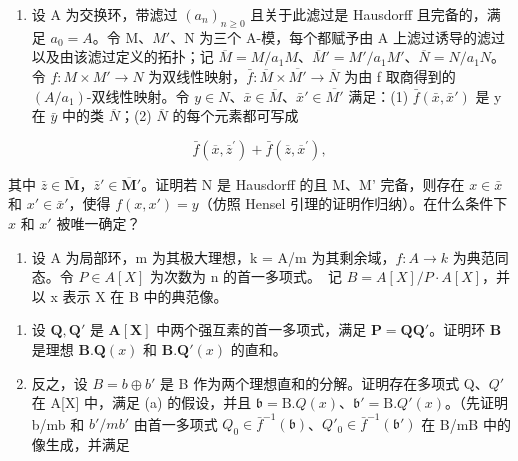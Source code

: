 
\begin{enumerate}
\def\labelenumi{\arabic{enumi}.}
\tightlist
\item
  设 A 为交换环，带滤过 \((a_{n})_{n\geq0}\) 且关于此滤过是 Hausdorff 且完备的，满足 \(a_{0}=A\)。令 M、\(M'\)、N 为三个 A-模，每个都赋予由 A 上滤过诱导的滤过以及由该滤过定义的拓扑；记 \(\overline{M}=M/a_{1}M\)、\(\overline{M}'=M'/a_{1}M'\)、\(\overline{N}=N/a_{1}N\)。令 \(f: M\times M'\to N\) 为双线性映射，\(\bar{f}: \overline{M}\times\overline{M'}\to\overline{N}\) 为由 f 取商得到的 \((A/a_{1})\)-双线性映射。令 \(y\in N\)、\(\bar{x}\in\overline{M}\)、\(\bar{x}'\in\overline{M'}\) 满足：(1) \(\bar{f}(\bar{x},\bar{x}')\) 是 y 在 \(\bar{y}\) 中的类 \(\overline{N}\)；(2) \(\overline{N}\) 的每个元素都可写成
\end{enumerate}

\[
\bar {f} (\overline {{{x}}}, \overline {{{z}}} ^ {\prime}) + \bar {f} (\overline {{{z}}}, \overline {{{x}}} ^ {\prime}),
\]

其中 \(\bar{z} \in \overline{\mathbf{M}}\)，\(\bar{z}' \in \overline{\mathbf{M}}'\)。证明若 N 是 Hausdorff 的且 M、M' 完备，则存在 \(x \in \bar{x}\) 和 \(x' \in \bar{x}'\)，使得 \(f(x, x') = y\)（仿照 Hensel 引理的证明作归纳）。在什么条件下 \(x\) 和 \(x'\) 被唯一确定？

\begin{enumerate}
\def\labelenumi{\arabic{enumi}.}
\setcounter{enumi}{1}
\tightlist
\item
  设 A 为局部环，m 为其极大理想，k = A/m 为其剩余域，\(f: A \to k\) 为典范同态。令 \(P \in A[X]\) 为次数为 n 的首一多项式。~记 \(B = A[X]/P \cdot A[X]\)，并以 x 表示 X 在 B 中的典范像。
\end{enumerate}

\begin{enumerate}
\def\labelenumi{(\alph{enumi})}
\item
   设 \(\mathbf{Q}, \mathbf{Q}'\) 是 \(\mathbf{A}[\mathbf{X}]\) 中两个强互素的首一多项式，满足 \(\mathbf{P} = \mathbf{QQ}'\)。证明环 \(\mathbf{B}\) 是理想 \(\mathbf{B}. \mathbf{Q}(x)\) 和 \(\mathbf{B}. \mathbf{Q}'(x)\) 的直和。
\item
  反之，设 \(B = b \oplus b'\) 是 B 作为两个理想直和的分解。证明存在多项式 Q、\(Q'\) 在 A{[}X{]} 中，满足 (a) 的假设，并且 \(\mathfrak{b} = \mathrm{B}.Q(x)\)、\(\mathfrak{b}' = \mathrm{B}.Q'(x)\)。（先证明 b/mb 和 \(b'/mb'\) 由首一多项式 \(Q_{0} \in \bar{f}^{-1}(\mathfrak{b})\)、\(Q'_{0} \in \bar{f}^{-1}(\mathfrak{b}')\) 在 B/mB 中的像生成，并满足
\end{enumerate}

